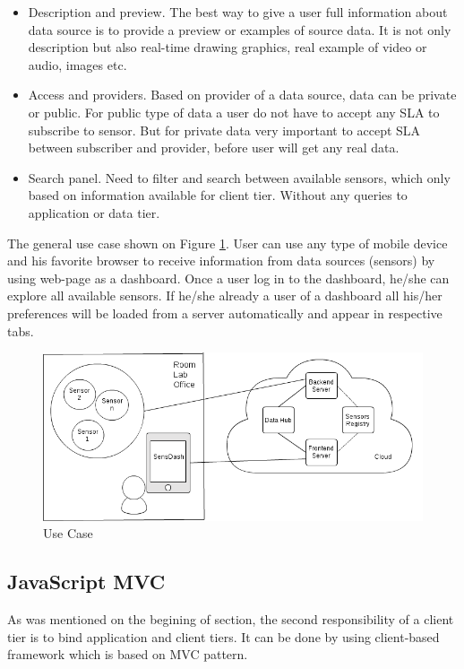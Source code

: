 \begin{itemize}
      \item Description and preview. The best way to give a user full information about data source is to provide a preview or examples of source data. It is not only description but also real-time drawing graphics, real example of video or audio, images etc.
      \item Access and providers. Based on provider of a data source, data can be private or public. For public type of data a user do not have to accept any SLA to subscribe to sensor. But for private data very important to accept SLA between subscriber and provider, before user will get any real data.
      \item Search panel. Need to filter and search between available sensors, which only based on information available for client tier. Without any queries to application or data tier.
      \end{itemize}

    The general use case shown on Figure \ref{img:use_case_basic}. User can use any type of mobile device and his favorite browser to receive information from data sources (sensors) by using web-page as a dashboard. Once a user log in to the dashboard, he/she can explore all available sensors. If he/she already a user of a dashboard all his/her preferences will be loaded from a server automatically and appear in respective tabs.

        \begin{figure}[!ht]
        \centering
        \includegraphics[scale=0.6]{images/User_Case.png}   
        \caption[Use Case]{Use Case}
        \label{img:use_case_basic}                        
        \end{figure}

    \subsection{JavaScript MVC}
    As was mentioned on the begining of section, the second responsibility of a client tier is to bind application and client tiers. It can be done by using client-based framework which is based on MVC pattern.


